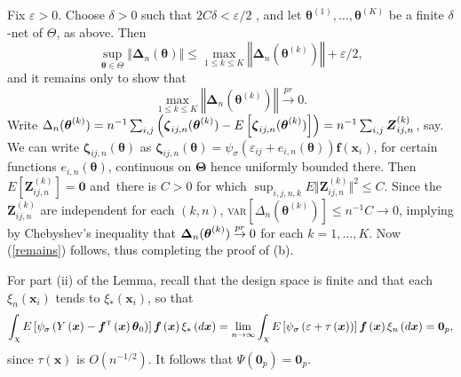 \documentclass[10pt,a4paper]{amsart}
\def\T{{ \mathrm{\scriptscriptstyle T} }}
\theoremstyle{plain}
\theoremstyle{definition}
\theoremstyle{remark}
\begin{document}
Fix $\varepsilon >0$. Choose $\delta >0$ such that $2C\delta <\varepsilon /2$%
, and let $\boldsymbol{\theta }^{(1)},\dots ,\boldsymbol{\theta }^{(K)}$ be
a finite $\delta $-net of $\Theta $, as above. Then 
\begin{equation*}
\sup_{\boldsymbol{\theta }\in \Theta }\left\Vert \boldsymbol{\Delta }_{n}(%
\boldsymbol{\theta })\right\Vert \leq \max_{1\leq k\leq K}\left\Vert 
\boldsymbol{\Delta }_{n}(\boldsymbol{\theta }^{(k)})\right\Vert +\varepsilon
/2,
\end{equation*}%
and it remains only to show that 
\begin{equation}
\max_{1\leq k\leq K}\left\Vert \boldsymbol{\Delta }_{n}(\boldsymbol{\theta }%
^{(k)})\right\Vert \overset{pr}{\rightarrow }0.  \label{remains}
\end{equation}%
Write $\Delta _{n}(\boldsymbol{\theta }^{(k)})=n^{-1}\sum_{i,j}\left( 
\boldsymbol{\zeta }_{ij,n}(\boldsymbol{\theta }^{(k)})-E\left[ \boldsymbol{%
\zeta }_{ij,n}(\boldsymbol{\theta }^{(k)})\right] \right) =n^{-1}\sum_{i,j}%
\boldsymbol{Z}_{ij,n}^{(k)}$, say. We can write $\boldsymbol{\zeta }_{ij,n}(%
\boldsymbol{\theta })$ as $\boldsymbol{\zeta }_{ij,n}(\boldsymbol{\theta })=\psi _{\sigma }\!\left(
\varepsilon _{ij}+e_{i,n}\left( \boldsymbol{\theta }\right) \right) 
\boldsymbol{f}(\boldsymbol{x}_{i})
$,
for certain functions $e_{i,n}\left( \boldsymbol{\theta }\right) $,
continuous on $\boldsymbol{\Theta }$ hence uniformly bounded there. Then $E[%
\boldsymbol{Z}_{ij,n}^{(k)}]=\boldsymbol{0}$ and{\ there is }$C>0$ for which 
{$\sup_{i,j,n,k}E\Vert \boldsymbol{Z}_{ij,n}^{(k)}\Vert ^{2}\leq C$}. Since
the $\boldsymbol{Z}_{ij,n}^{(k)}$ are independent for each $(k,n)$, \textsc{%
var}$\left[ \Delta _{n}(\boldsymbol{\theta }^{(k)})\right] \leq
n^{-1}C\rightarrow 0$, implying by Chebyshev's inequality that $\boldsymbol{%
\Delta }_{n}(\boldsymbol{\theta }^{(k)})\overset{pr}{\rightarrow }0$ for
each $k=1,\dots ,K$. Now (\ref{remains}) follows, thus completing the proof
of (b).

For part (ii) of the Lemma, recall that the design space
is finite and that each $\xi _{n}\left( \boldsymbol{x}_{i}\right) $ tends to 
$\xi _{\ast }\left( \boldsymbol{x}_{i}\right) $, so that
\begin{equation}
\int_{\mathcal{\chi }}E\left[ \psi _{\sigma }\left( Y\left( \boldsymbol{x}%
\right) -\boldsymbol{f}^{\T }\left( \boldsymbol{x}\right) \boldsymbol{%
\theta }_{0}\right) \right] \boldsymbol{f}\left( \boldsymbol{x}\right) \xi
_{\ast }\left( d\boldsymbol{x}\right) =\lim_{n\rightarrow \infty }\int_{%
\mathcal{\chi }}E\left[ \psi _{\sigma }\left( \varepsilon +\tau \left( 
\boldsymbol{x}\right) \right) \right] \boldsymbol{f}\left( \boldsymbol{x}%
\right) \xi _{n}\left( d\boldsymbol{x}\right) =\boldsymbol{0}_p,  \label{root}
\end{equation}%
since $\tau \left( \boldsymbol{x}\right) $ is $O\left( n^{-1/2}\right) $. It
follows that $\Psi \left( \boldsymbol{0}_p\right) =\boldsymbol{0}_p $.
\end{document}
